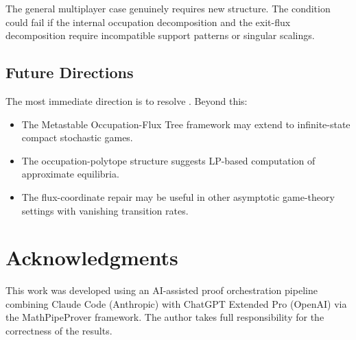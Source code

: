 \documentclass[12pt,a4paper]{article}
\theoremstyle{definition}
\begin{document}
The general multiplayer case genuinely requires new structure.  The condition could fail if the internal occupation decomposition and the exit-flux decomposition require incompatible support patterns or singular scalings.

\subsection{Future Directions}

The most immediate direction is to resolve .  Beyond this:
\begin{itemize}
\item The Metastable Occupation-Flux Tree framework may extend to infinite-state compact stochastic games.
\item The occupation-polytope structure suggests LP-based computation of approximate equilibria.
\item The flux-coordinate repair may be useful in other asymptotic game-theory settings with vanishing transition rates.
\end{itemize}

\section*{Acknowledgments}

This work was developed using an AI-assisted proof orchestration pipeline combining Claude Code (Anthropic) with ChatGPT Extended Pro (OpenAI) via the MathPipeProver framework.  The author takes full responsibility for the correctness of the results.
\end{document}

